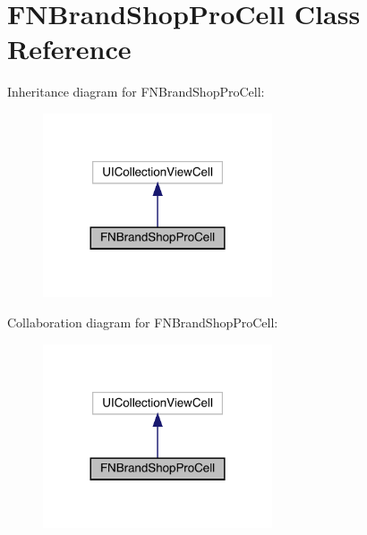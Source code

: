 \hypertarget{interface_f_n_brand_shop_pro_cell}{}\section{F\+N\+Brand\+Shop\+Pro\+Cell Class Reference}
\label{interface_f_n_brand_shop_pro_cell}


Inheritance diagram for F\+N\+Brand\+Shop\+Pro\+Cell\+:\nopagebreak
\begin{figure}[H]
\begin{center}
\leavevmode
\includegraphics[width=192pt]{interface_f_n_brand_shop_pro_cell__inherit__graph}
\end{center}
\end{figure}


Collaboration diagram for F\+N\+Brand\+Shop\+Pro\+Cell\+:\nopagebreak
\begin{figure}[H]
\begin{center}
\leavevmode
\includegraphics[width=192pt]{interface_f_n_brand_shop_pro_cell__coll__graph}
\end{center}
\end{figure}
